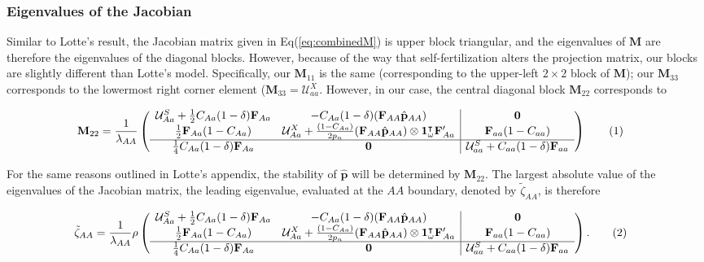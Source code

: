 \documentclass[11pt]{article}
\newcommand\numberthis{\addtocounter{equation}{1}\tag{\theequation}}
\def\mbf#1{\mathbf{#1}}
\def\mcal#1{\mathcal{#1}}
\begin{document}
\subsubsection*{Eigenvalues of the Jacobian}

Similar to Lotte's result, the Jacobian matrix given in Eq(\ref{eq:combinedM}) is upper block triangular, and the eigenvalues of $\mbf{M}$ are therefore the eigenvalues of the diagonal blocks. However, because of the way that self-fertilization alters the projection matrix, our blocks are slightly different than Lotte's model. Specifically, our $\mbf{M}_{11}$ is the same (corresponding to the upper-left $2 \times 2$  block of $\mbf{M}$); our $\mbf{M}_{33}$ corresponds to the lowermost right corner element ($\mbf{M}_{33} = \mathcal{U}^{X}_{aa}$. However, in our case, the central diagonal block $\mbf{M}_{22}$ corresponds to 

 \begin{align*} \label{eq:M22}
	\mbf{M}_{22} = 
		\frac{1}{\lambda_{AA}} &\left(\begin{array}{cc|c}
				\mcal{U}^S_{Aa} + \frac{1}{2} C_{Aa} (1 - \delta) \mbf{F}_{Aa} & -C_{Aa}(1 - \delta) (\mbf{F}_{AA} \hat{\mbf{p}}_{AA}) & \mbf{0} \\
				\frac{1}{2} \mbf{F}_{Aa} (1 - C_{Aa}) & \mcal{U}^X_{Aa} + \frac{(1 - C_{Aa})}{2 p_n} (\mbf{F}_{AA} \hat{\mbf{p}}_{AA}) \otimes \mbf{1}^{\intercal}_{\omega} \mbf{F}^{\prime}_{Aa} & \mbf{F}_{aa} (1 - C_{aa}) \\ \hline
				\frac{1}{4} C_{Aa} (1 - \delta) \mbf{F}_{Aa} & \mbf{0} & \mcal{U}^S_{aa} + C_{aa} (1 - \delta) \mbf{F}_{aa} \\ 
			\end{array} \right) \numberthis
\end{align*}

For the same reasons outlined in Lotte's appendix, the stability of $\hat{\mbf{p}}$ will be determined by $\mbf{M}_{22}$. The largest absolute value of the eigenvalues of the Jacobian matrix, the leading eigenvalue, evaluated at the $AA$ boundary, denoted by $\tilde{\zeta}_{AA}$, is therefore

\begin{align*} \label{eq:eigAA}
	\tilde{\zeta}_{AA} = 
		\frac{1}{\lambda_{AA}} \rho&\left(\begin{array}{cc|c}
				\mcal{U}^S_{Aa} + \frac{1}{2} C_{Aa} (1 - \delta) \mbf{F}_{Aa} & -C_{Aa}(1 - \delta) (\mbf{F}_{AA} \hat{\mbf{p}}_{AA}) & \mbf{0} \\
				\frac{1}{2} \mbf{F}_{Aa} (1 - C_{Aa}) & \mcal{U}^X_{Aa} + \frac{(1 - C_{Aa})}{2 p_n} (\mbf{F}_{AA} \hat{\mbf{p}}_{AA}) \otimes \mbf{1}^{\intercal}_{\omega} \mbf{F}^{\prime}_{Aa} & \mbf{F}_{aa} (1 - C_{aa}) \\ \hline
				\frac{1}{4} C_{Aa} (1 - \delta) \mbf{F}_{Aa} & \mbf{0} & \mcal{U}^S_{aa} + C_{aa} (1 - \delta) \mbf{F}_{aa} \\ 
			\end{array} \right). \numberthis
\end{align*}
\end{document}
